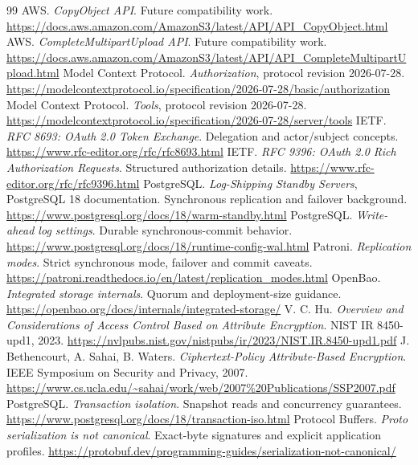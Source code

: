 \documentclass[11pt,a4paper]{article}
\begin{document}
\begin{thebibliography}{99}
 AWS. \emph{CopyObject API}. Future compatibility work. \url{https://docs.aws.amazon.com/AmazonS3/latest/API/API_CopyObject.html}
 AWS. \emph{CompleteMultipartUpload API}. Future compatibility work. \url{https://docs.aws.amazon.com/AmazonS3/latest/API/API_CompleteMultipartUpload.html}
 Model Context Protocol. \emph{Authorization}, protocol revision 2026-07-28. \url{https://modelcontextprotocol.io/specification/2026-07-28/basic/authorization}
 Model Context Protocol. \emph{Tools}, protocol revision 2026-07-28. \url{https://modelcontextprotocol.io/specification/2026-07-28/server/tools}
 IETF. \emph{RFC 8693: OAuth 2.0 Token Exchange}. Delegation and actor/subject concepts. \url{https://www.rfc-editor.org/rfc/rfc8693.html}
 IETF. \emph{RFC 9396: OAuth 2.0 Rich Authorization Requests}. Structured authorization details. \url{https://www.rfc-editor.org/rfc/rfc9396.html}
 PostgreSQL. \emph{Log-Shipping Standby Servers}, PostgreSQL 18 documentation. Synchronous replication and failover background. \url{https://www.postgresql.org/docs/18/warm-standby.html}
 PostgreSQL. \emph{Write-ahead log settings}. Durable synchronous-commit behavior. \url{https://www.postgresql.org/docs/18/runtime-config-wal.html}
 Patroni. \emph{Replication modes}. Strict synchronous mode, failover and commit caveats. \url{https://patroni.readthedocs.io/en/latest/replication_modes.html}
 OpenBao. \emph{Integrated storage internals}. Quorum and deployment-size guidance. \url{https://openbao.org/docs/internals/integrated-storage/}
 V. C. Hu. \emph{Overview and Considerations of Access Control Based on Attribute Encryption}. NIST IR 8450-upd1, 2023. \url{https://nvlpubs.nist.gov/nistpubs/ir/2023/NIST.IR.8450-upd1.pdf}
 J. Bethencourt, A. Sahai, B. Waters. \emph{Ciphertext-Policy Attribute-Based Encryption}. IEEE Symposium on Security and Privacy, 2007. \url{https://www.cs.ucla.edu/~sahai/work/web/2007%20Publications/SSP2007.pdf}
 PostgreSQL. \emph{Transaction isolation}. Snapshot reads and concurrency guarantees. \url{https://www.postgresql.org/docs/18/transaction-iso.html}
 Protocol Buffers. \emph{Proto serialization is not canonical}. Exact-byte signatures and explicit application profiles. \url{https://protobuf.dev/programming-guides/serialization-not-canonical/}
\end{thebibliography}
\end{document}
